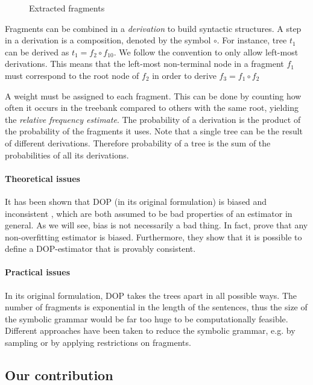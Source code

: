 \begin{figure}[h!]
\center 
\caption{Extracted fragments}
\label{f:fragments}
\end{figure}


Fragments can be combined in a \emph{derivation} to build syntactic structures. A step in a derivation is a composition, denoted by the symbol $\circ$. For instance, tree $t_1$ can be derived as $t_1=f_2\circ f_{10}$. We follow the convention to only allow left-most derivations. This means that the left-most non-terminal node in a fragment $f_1$ must correspond to the root node of $f_2$ in order to derive $f_3=f_1\circ f_2$

A weight must be assigned to each fragment. This can be done by counting how often it occurs in the treebank compared to others with the same root, yielding the \emph{relative frequency estimate}. The probability of a derivation is the product of the probability of the fragments it uses. Note that a single tree can be the result of different derivations. Therefore probability of a tree is the sum of the probabilities of all its derivations.

\paragraph{Theoretical issues}
It has been shown that DOP (in its original formulation) is biased and inconsistent \cite{johnson2002}, which are both assumed to be bad properties of an estimator in general. As we will see, bias is not necessarily a bad thing. In fact, \cite{zollmann2005} prove that any non-overfitting estimator is biased. Furthermore, they show that it is possible to define a DOP-estimator that is provably consistent. %


\paragraph{Practical issues}
In its original formulation, DOP takes the trees apart in all possible ways. The number of fragments is exponential in the length of the sentences, thus the size of the symbolic grammar would be far too huge to be computationally feasible. %
Different approaches have been taken to reduce the symbolic grammar, e.g. by sampling or by applying restrictions on fragments.

\subsection{Our contribution}

